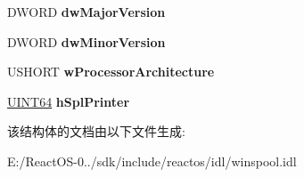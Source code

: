 \begin{DoxyCompactItemize}
\item 
\mbox{\label{struct___w_i_n_s_p_o_o_l___s_p_l_c_l_i_e_n_t___i_n_f_o__3_a10c62f512d71b1f4570c5db20a1f9307}} 
D\+W\+O\+RD {\bfseries dw\+Major\+Version}
\item 
\mbox{\label{struct___w_i_n_s_p_o_o_l___s_p_l_c_l_i_e_n_t___i_n_f_o__3_aa09f31e33683ca77b40664bdeefe3e66}} 
D\+W\+O\+RD {\bfseries dw\+Minor\+Version}
\item 
\mbox{\label{struct___w_i_n_s_p_o_o_l___s_p_l_c_l_i_e_n_t___i_n_f_o__3_a436a1dc8d8333b5fd663071e40cbdafd}} 
U\+S\+H\+O\+RT {\bfseries w\+Processor\+Architecture}
\item 
\mbox{\label{struct___w_i_n_s_p_o_o_l___s_p_l_c_l_i_e_n_t___i_n_f_o__3_a4d8b36b7ce25696cab8a8a2f70c39336}} 
\hyperlink{_processor_bind_8h_a57be03562867144161c1bfee95ca8f7c}{U\+I\+N\+T64} {\bfseries h\+Spl\+Printer}
\end{DoxyCompactItemize}


该结构体的文档由以下文件生成\+:\begin{DoxyCompactItemize}
\item 
E\+:/\+React\+O\+S-\/0../sdk/include/reactos/idl/winspool.\+idl\end{DoxyCompactItemize}
